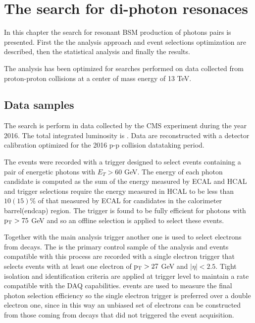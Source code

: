 \chapter{The search for di-photon resonaces}
\label{chapter:diphotons}

In this chapter the search for resonant BSM production of photons pairs is presented.
First the the analysis approach and event selections optimization are described, then
the statistical analysis and finally the results.

The analysis has been optimized for searches performed on data collected from proton-proton
collisions at a center of mass energy of 13 TeV.


\section{Data samples}
\label{sec:diphotons_data_samples}
The search is perform in data collected by the CMS experiment during the year 2016. The total
integrated luminosity is \lumisix. Data are reconstructed with a detector calibration optimized
for the 2016 p-p collision datataking period.

The events were recorded with a trigger designed to select events containing a pair of
energetic photons with $E_T > 60$ GeV. The energy of each photon candidate is computed as
the sum of the energy measured by ECAL and HCAL and trigger selections require
the energy measured in HCAL to be less than $10(15)\%$ of that measured by ECAL for candidates
in the calorimeter barrel(endcap) region.
The trigger is found to be fully efficient for photons with $\mathrm{p_{T}} > 75$ GeV and so an offline
selection is applied to select these events.

Together with the main analysis trigger another one is used to select electrons from \Zee decays.
The \Zee is the primary control sample of the analysis and events compatible with this process
are recorded with a single electron trigger that selects events with at least one electron of
$\mathrm{p_{T}} > 27$ GeV and $|\eta| < 2.5$. Tight isolation and identification criteria are applied at trigger
level to maintain a rate compatible with the DAQ capabilities.
\Zee events are used to measure the final photon selection efficiency so the single electron trigger
is preferred over a double electron one, since in this way an unbiased set of electrons can be
constructed from those coming from \Zee decays that did not triggered the event acquisition.

